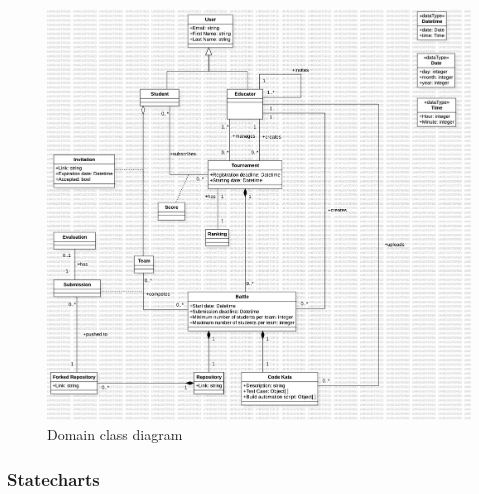 \begin{figure}[H]
    \centering
    \includegraphics[width=1\textwidth]{Diagrams/DomainClassDiagram.jpg}
    \caption{Domain class diagram}
    \label{fig:domain_class_diagram}
\end{figure}

\subsubsection{Statecharts}

